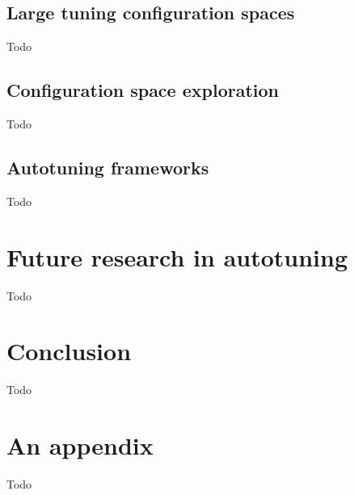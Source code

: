 \documentclass[
  digital,     %
  oneside,     %
  nosansbold,  %
  nocolorbold, %
  lof,         %
  lot,         %
  nocover
]{fithesis4}
\begin{document}
\section{Large tuning configuration spaces}
Todo

\section{Configuration space exploration}
Todo

\section{Autotuning frameworks}
Todo

\chapter{Future research in autotuning}
Todo

\chapter{Conclusion}
Todo

\nocite{*}
\printbibliography[heading=bibintoc]

\appendix
\chapter{An appendix}
Todo
\end{document}
